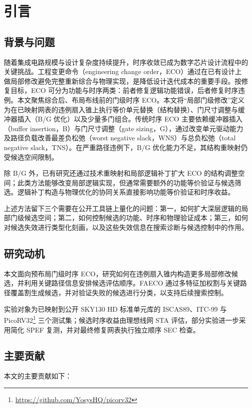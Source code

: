 \documentclass[twocolumn,10pt,fontset=windows]{ctexart}
\begin{document}
\section{引言}

\subsection{背景与问题}
随着集成电路规模与设计复杂度持续提升，时序收敛已成为数字芯片设计流程中的关键挑战。工程变更命令（engineering change order，ECO）通过在已有设计上做局部修改避免完整重新综合与物理实现，是降低设计迭代成本的重要手段。按修复目标，ECO 可分为功能与时序两类：前者修复逻辑功能错误，后者修复时序违例。本文聚焦综合后、布局布线前的门级时序 ECO。本文将“局部门级修改”定义为在已映射网表的违例扇入锥上执行等价单元替换（结构替换）、门尺寸调整与缓冲器插入（B/G 优化）以及少量多门组合。传统时序 ECO 主要依赖缓冲器插入（buffer insertion，B）与门尺寸调整（gate sizing，G），通过改变单元驱动能力及路径负载改善最差负松弛（worst negative slack，WNS）与总负松弛（total negative slack，TNS）。在严重路径违例下，B/G 优化能力不足，其结构重映射仍受候选空间限制\cite{ho2010eco,liu2021rlsizer,chen2024aito}。

除 B/G 外，已有研究还通过技术重映射和局部逻辑补丁扩大 ECO 的结构调整空间；此类方法能够改变局部逻辑实现，但通常需要额外的功能等价验证与候选筛选。逻辑补丁构造与物理优化的协同关系直接影响功能等价验证和时序收益。

上述方法留下三个需要在公开工具链上量化的问题：第一，如何扩大深层逻辑的局部门级候选空间；第二，如何控制候选的功能、时序和物理验证成本；第三，如何对候选失效进行类型化刻画，以及这些失效信息在搜索诊断与候选控制中的作用。
\subsection{研究动机}
本文面向预布局门级时序 ECO，研究如何在违例扇入锥内构造更多局部修改候选，并利用关键路径信息安排候选评估顺序。FAECO 通过多特征加权割与关键路径覆盖割生成候选，并对验证失败的候选进行分类，以支持后续搜索控制。

实验对象为已映射到公开 SKY130 HD 标准单元库的 ISCAS89\cite{iscas89}、ITC-99\cite{itc99} 与 PicoRV32\footnote{\url{https://github.com/YosysHQ/picorv32}} 三个测试集；候选时序收益由理想线网 STA 评估，部分实验进一步采用简化 SPEF 复测，并对最终修复网表执行独立顺序 SEC 检查。

\subsection{主要贡献}
本文的主要贡献如下：
\end{document}
